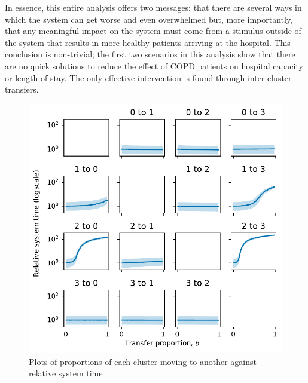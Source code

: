 In essence, this entire analysis offers two messages: that there are several
ways in which the system can get worse and even overwhelmed but, more
importantly, that any meaningful impact on the system must come from a stimulus
outside of the system that results in more healthy patients arriving at the
hospital. This conclusion is non-trivial; the first two scenarios in this
analysis show that there are no quick solutions to reduce the effect of COPD
patients on hospital capacity or length of stay. The only effective intervention
is found through inter-cluster transfers.

\begin{figure}
    \centering
    \includegraphics[width=\textwidth]{moving_time}
    \caption{%
        Plots of proportions of each cluster moving to another against relative
        system time
    }\label{fig:moving_time}
\end{figure}

